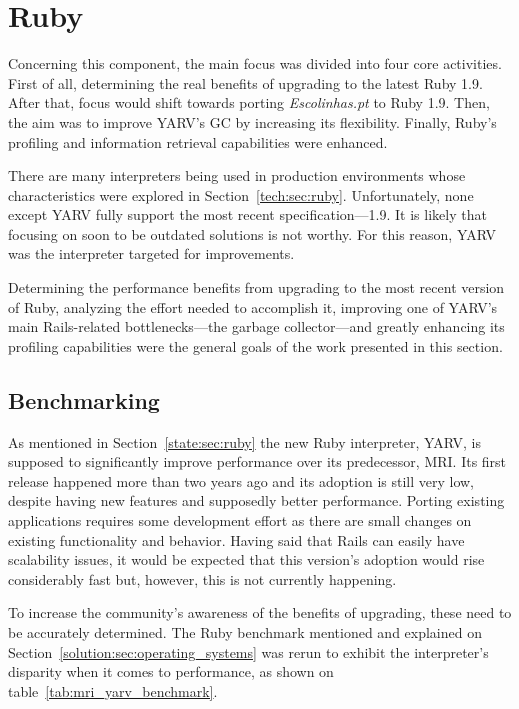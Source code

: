 \section{Ruby} %
\label{solution:sec:ruby}
Concerning this component, the main focus was divided into four core activities. First of all, determining the real benefits of upgrading to the latest Ruby 1.9. After that, focus would shift towards porting \textit{Escolinhas.pt} to Ruby 1.9. Then, the aim was to improve YARV's GC by increasing its flexibility. Finally, Ruby's profiling and information retrieval capabilities were enhanced.

There are many interpreters being used in production environments whose characteristics were explored in Section~\ref{tech:sec:ruby}. Unfortunately, none except YARV fully support the most recent specification---1.9. It is likely that focusing on soon to be outdated solutions is not worthy. For this reason, YARV was the interpreter targeted for improvements.

Determining the performance benefits from upgrading to the most recent version of Ruby, analyzing the effort needed to accomplish it, improving one of YARV's main Rails-related bottlenecks---the garbage collector---and greatly enhancing its profiling capabilities were the general goals of the work presented in this section.

\subsection{Benchmarking}
As mentioned in Section~\ref{state:sec:ruby} the new Ruby interpreter, YARV, is supposed to significantly improve performance over its predecessor, MRI. Its first release happened more than two years ago and its adoption is still very low, despite having new features and supposedly better performance. Porting existing applications requires some development effort as there are small changes on existing functionality and behavior. Having said that Rails can easily have scalability issues, it would be expected that this version's adoption would rise considerably fast but, however, this is not currently happening.

To increase the community's awareness of the benefits of upgrading, these need to be accurately determined. The Ruby benchmark mentioned and explained on Section~\ref{solution:sec:operating_systems} was rerun to exhibit the interpreter's disparity when it comes to performance, as shown on table~\ref{tab:mri_yarv_benchmark}.

